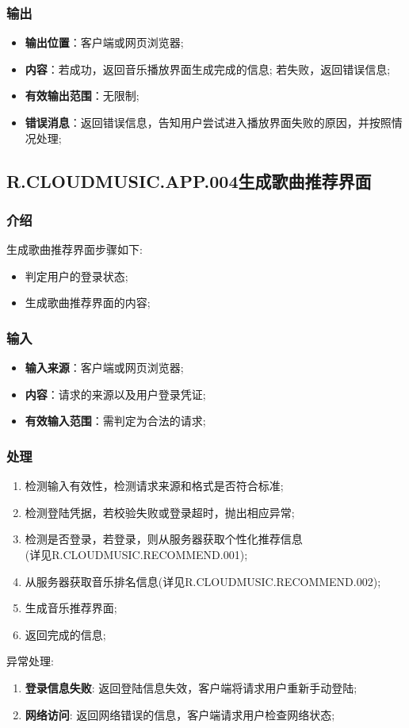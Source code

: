 \subsubsection{输出}
\begin{itemize}
	\item \textbf{输出位置}：客户端或网页浏览器;
	\item \textbf{内容}：若成功，返回音乐播放界面生成完成的信息; 若失败，返回错误信息;
	\item \textbf{有效输出范围}：无限制;
	\item \textbf{错误消息}：返回错误信息，告知用户尝试进入播放界面失败的原因，并按照情况处理;
\end{itemize}

\subsection{R.CLOUDMUSIC.APP.004生成歌曲推荐界面}
\subsubsection{介绍}
生成歌曲推荐界面步骤如下: 
	\begin{itemize}
		\item 判定用户的登录状态;
		\item 生成歌曲推荐界面的内容;
	\end{itemize}
\subsubsection{输入}
	\begin{itemize}
		\item \textbf{输入来源}：客户端或网页浏览器;
		\item \textbf{内容}：请求的来源以及用户登录凭证;
		\item \textbf{有效输入范围}：需判定为合法的请求;
	\end{itemize}
\subsubsection{处理}
	\begin{enumerate}
		\item 检测输入有效性，检测请求来源和格式是否符合标准;
		\item 检测登陆凭据，若校验失败或登录超时，抛出相应异常;
		\item 检测是否登录，若登录，则从服务器获取个性化推荐信息
			\\(详见R.CLOUDMUSIC.RECOMMEND.001);
		\item 从服务器获取音乐排名信息(详见R.CLOUDMUSIC.RECOMMEND.002);
		\item 生成音乐推荐界面;
		\item 返回完成的信息;
	\end{enumerate}
	\noindent 异常处理: 
	\begin{enumerate}
		\item \textbf{登录信息失败}: 返回登陆信息失效，客户端将请求用户重新手动登陆;
		\item \textbf{网络访问}: 返回网络错误的信息，客户端请求用户检查网络状态;
	\end{enumerate}
